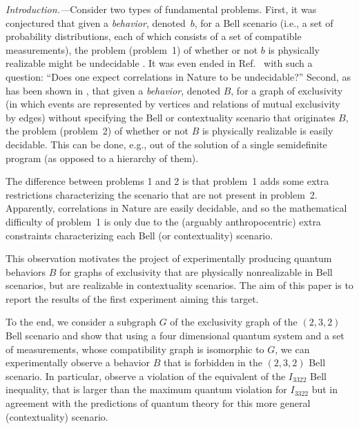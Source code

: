 \documentclass[prl,letterpaper,english,reprint,nofootinbib,aps,superscriptaddress,showpacs,showkeys]{revtex4-1}
\theoremstyle{definition}
\theoremstyle{remark}
\begin{document}

\maketitle

\emph{Introduction.---}Consider two types of fundamental problems. First, it was conjectured that given a \emph{behavior}, denoted~$b$, for a Bell scenario (i.e., a set of probability distributions, each of which consists of a set of compatible measurements), the problem (problem~1) of whether or not $b$ is physically realizable might be undecidable \cite{NGHA15}. It was even ended in Ref.~\cite{NGHA15} with such a question: ``Does one expect correlations in Nature to be
undecidable?''
Second, as has been shown in \cite{CSW14}, that given a \emph{behavior}, denoted $B$, for a graph of exclusivity (in which events are represented by vertices and relations of mutual exclusivity by edges) without specifying the Bell or contextuality scenario that originates $B$, the problem (problem~2) of whether or not $B$ is physically realizable is easily decidable. This can be done, e.g., out of the solution of a single semidefinite program (as opposed to a hierarchy of them).

The difference between problems 1 and 2 is that problem~1 adds some extra restrictions characterizing the scenario that are not present in problem~2. Apparently, correlations in Nature are easily decidable, and so the mathematical difficulty of problem~1 is only due to the (arguably anthropocentric) extra constraints characterizing each Bell (or contextuality) scenario.

This observation motivates the project of experimentally producing quantum behaviors $B$ for graphs of exclusivity that are physically nonrealizable in Bell scenarios, but are realizable in contextuality scenarios. The aim of this paper is to report the results of the first experiment aiming this target.

To the end, we consider a subgraph $G$ of the exclusivity graph of the $(2,3,2)$ Bell scenario and show that using a four dimensional quantum system and a set of measurements, whose compatibility graph is isomorphic to $G$, we can experimentally observe a behavior $B$ that is forbidden in the $(2,3,2)$ Bell scenario. In particular, observe a violation of the equivalent of the $I_{3322}$ Bell inequality, that is larger than the maximum quantum violation for $I_{3322}$ but in agreement with the predictions of quantum theory for this more general (contextuality) scenario.
\end{document}
